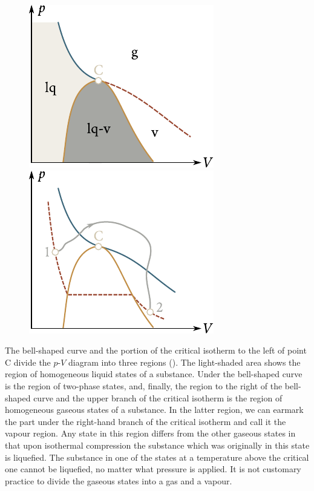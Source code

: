 \begin{figure}[t]
	\begin{minipage}[t]{0.5\linewidth}
		\begin{center}
			\includegraphics[scale=1]{figures/ch_15/fig_15_6.pdf}
			\caption[]{}
			\label{fig:15_6}
		\end{center}
	\end{minipage}
	\hspace{-0.05cm}
	\begin{minipage}[t]{0.5\linewidth}
		\begin{center}
			\includegraphics[scale=1]{figures/ch_15/fig_15_7.pdf}
			\caption[]{}
			\label{fig:15_7}
		\end{center}
	\end{minipage}
	\vspace{-0.4cm}
\end{figure}

The bell-shaped curve and the portion of the critical isotherm to the left of point C divide the $p$-$V$ diagram into three regions (). The light-shaded area shows the region of homogeneous liquid states of a substance. Under the bell-shaped curve is the region of two-phase states, and, finally, the region to the right of the bell-shaped curve and the upper branch of the critical isotherm is the region of homogeneous gaseous states of a substance. In the latter region, we can earmark the part under the right-hand branch of the critical isotherm and call it the vapour region. Any state in this region differs from the other gaseous states in that upon isothermal compression the substance which was originally in this state is liquefied. The substance in one of the states at a temperature above the critical one cannot be liquefied, no matter what pressure is applied. It is not customary practice to divide the gaseous states into a gas and a vapour.

